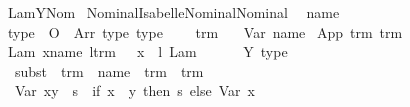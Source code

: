 %
\begin{isabellebody}%
%
%
\isamarkuptrue%
%
\isadelimtheory
%
\endisadelimtheory
%
\isatagtheory
{}\isamarkupfalse%
\ LamYNom\isanewline
{}\ {\isachardoublequoteopen}Nominal{}{\isacharminus}Isabelle{\isacharslash}Nominal{\isacharslash}Nominal{}{\isachardoublequoteclose}\ %
\endisatagtheory
{\isafoldtheory}%
%
\isadelimtheory
%
\endisadelimtheory
%
\isamarkuptrue%
\isamarkupfalse%
\ name\isanewline
\isanewline
{}\isamarkupfalse%
\ type\ {\isacharequal}\ O\ {\isacharbar}\ Arr\ type\ type\ {\isacharparenleft}{\isachardoublequoteopen}{\isacharunderscore}\ {\isasymrightarrow}\ {\isacharunderscore}{\isachardoublequoteclose}{\isacharparenright}\isanewline
\isanewline
{}\isamarkupfalse%
\ trm\ {\isacharequal}\isanewline
\ \ Var\ name\isanewline
{\isacharbar}\ App\ trm\ trm\isanewline
{\isacharbar}\ Lam\ x{\isacharcolon}{\isacharcolon}name\ l{\isacharcolon}{\isacharcolon}trm\ \ \ x\ \ l\ {\isacharparenleft}{\isachardoublequoteopen}Lam\ {\isacharbrackleft}{\isacharunderscore}{\isacharbrackright}{\isachardot}\ {\isacharunderscore}{\isachardoublequoteclose}\ {\isacharbrackleft}{}{}{}{\isacharcomma}\ {}{}{}{\isacharbrackright}\ {}{}{}{\isacharparenright}\isanewline
{\isacharbar}\ Y\ type%
\isamarkuptrue%
\isamarkupfalse%
\isanewline
\ \ subst\ {\isacharcolon}{\isacharcolon}\ {\isachardoublequoteopen}trm\ {\isasymRightarrow}\ name\ {\isasymRightarrow}\ trm\ {\isasymRightarrow}\ trm{\isachardoublequoteclose}\ \ {\isacharparenleft}{\isachardoublequoteopen}{\isacharunderscore}\ {\isacharbrackleft}{\isacharunderscore}\ {\isacharcolon}{\isacharcolon}{\isacharequal}\ {\isacharunderscore}{\isacharbrackright}{\isachardoublequoteclose}\ {\isacharbrackleft}{}{}{\isacharcomma}\ {}{}{\isacharcomma}\ {}{}{\isacharbrackright}\ {}{}{\isacharparenright}\isanewline
{}\isanewline
\ \ {\isachardoublequoteopen}{\isacharparenleft}Var\ x{\isacharparenright}{\isacharbrackleft}y\ {\isacharcolon}{\isacharcolon}{\isacharequal}\ s{\isacharbrackright}\ {\isacharequal}\ {\isacharparenleft}if\ x\ {\isacharequal}\ y\ then\ s\ else\ {\isacharparenleft}Var\ x{\isacharparenright}{\isacharparenright}{\isachardoublequoteclose}\isanewline

\end{isabellebody}
